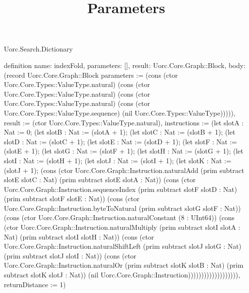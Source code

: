 \begin{lexlean}{Uorc.Search.Dictionary}
\title{Parameters}
\begin{semanticmodule}
definition{
  name: indexFold,
  parameters: [],
  result: Uorc.Core.Graph::Block,
  body: (record Uorc.Core.Graph::Block {parameters := (cons (ctor Uorc.Core.Types::ValueType.natural) (cons (ctor Uorc.Core.Types::ValueType.natural) (cons (ctor Uorc.Core.Types::ValueType.natural) (cons (ctor Uorc.Core.Types::ValueType.sequence) (nil Uorc.Core.Types::ValueType))))), result := (ctor Uorc.Core.Types::ValueType.natural), instructions := (let slotA : Nat := 0; (let slotB : Nat := (slotA + 1); (let slotC : Nat := (slotB + 1); (let slotD : Nat := (slotC + 1); (let slotE : Nat := (slotD + 1); (let slotF : Nat := (slotE + 1); (let slotG : Nat := (slotF + 1); (let slotH : Nat := (slotG + 1); (let slotI : Nat := (slotH + 1); (let slotJ : Nat := (slotI + 1); (let slotK : Nat := (slotJ + 1); (cons (ctor Uorc.Core.Graph::Instruction.naturalAdd (prim subtract slotE slotC : Nat) (prim subtract slotE slotA : Nat)) (cons (ctor Uorc.Core.Graph::Instruction.sequenceIndex (prim subtract slotF slotD : Nat) (prim subtract slotF slotE : Nat)) (cons (ctor Uorc.Core.Graph::Instruction.byteToNatural (prim subtract slotG slotF : Nat)) (cons (ctor Uorc.Core.Graph::Instruction.naturalConstant (8 : UInt64)) (cons (ctor Uorc.Core.Graph::Instruction.naturalMultiply (prim subtract slotI slotA : Nat) (prim subtract slotI slotH : Nat)) (cons (ctor Uorc.Core.Graph::Instruction.naturalShiftLeft (prim subtract slotJ slotG : Nat) (prim subtract slotJ slotI : Nat)) (cons (ctor Uorc.Core.Graph::Instruction.naturalOr (prim subtract slotK slotB : Nat) (prim subtract slotK slotJ : Nat)) (nil Uorc.Core.Graph::Instruction))))))))))))))))))), returnDistance := 1})
}


\end{semanticmodule}
\end{lexlean}
